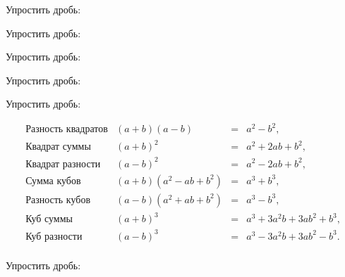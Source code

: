 %
%

\begin{class}[number=1]
	\begin{listofex}
	\item Упростить дробь:
	\begin{itasks}[3]
		\task {}
		\task {}
		\task {}
		\task {}
		\task {}
		\task {}
	\end{itasks}
	\item Упростить дробь:
	\begin{itasks}[2]
		\task {}
		\task {}
		\task {}
		\task {}
	\end{itasks}
	\item Упростить дробь:
	\begin{itasks}[3]
		\task {}
		\task {}
		\task {}
		\task {}
		\task {}
	\end{itasks}
	\item Упростить дробь:
	\begin{itasks}[2]
		\task {}
		\task {}
		\task {}
		\task {}
		\task {}
	\end{itasks}
	\item Упростить дробь:
	\begin{itasks}[3]
		\task {}
		\task {}
		\task {}
	\end{itasks}
	\[ \begin{array}{cccc}
		\text{Разность квадратов}&(a+b)(a-b)& =&a^2-b^2,\\
		\text{Квадрат суммы}&(a+b)^2& =&a^2+2ab+b^2,\\
		\text{Квадрат разности}&(a-b)^2& =&a^2-2ab+b^2,\\
		\text{Сумма кубов}&(a+b)(a^2-ab+b^2)& =&a^3+b^3,\\
		\text{Разность кубов}&(a-b)(a^2+ab+b^2)& =&a^3-b^3,\\
		\text{Куб суммы}&(a+b)^3& =&a^3+3a^2b+3ab^2+b^3,\\
		\text{Куб разности}&(a-b)^3& =&a^3-3a^2b+3ab^2-b^3.\\
	\end{array} \]
	\item Упростить дробь:
	\begin{itasks}[3]
		\task {}
		\task {}
		\task {}
		\task {}
		\task {}
		\task {}
	\end{itasks}
\end{listofex}
\end{class}

